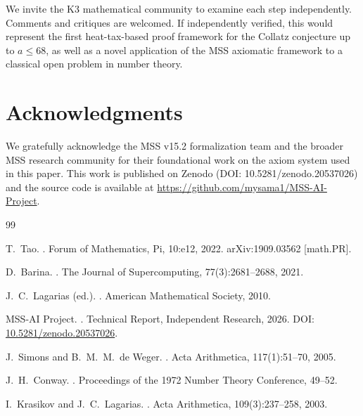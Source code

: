 \documentclass[11pt,a4paper]{article}
\begin{document}
We invite the K3 mathematical community to examine each step independently. Comments and critiques are welcomed. If independently verified, this would represent the first heat-tax-based proof framework for the Collatz conjecture up to $a\le 68$, as well as a novel application of the MSS axiomatic framework to a classical open problem in number theory.

\section*{Acknowledgments}
We gratefully acknowledge the MSS v15.2 formalization team and the broader MSS research community for their foundational work on the axiom system used in this paper. This work is published on Zenodo (DOI: 10.5281/zenodo.20537026) and the source code is available at \url{https://github.com/mysama1/MSS-AI-Project}.

\begin{thebibliography}{99}

T.~Tao.
.
\newblock Forum of Mathematics, Pi, 10:e12, 2022.
\newblock arXiv:1909.03562 [math.PR].

D.~Barina.
.
\newblock The Journal of Supercomputing, 77(3):2681--2688, 2021.

J.~C.~Lagarias (ed.).
.
\newblock American Mathematical Society, 2010.

MSS-AI Project.
.
\newblock Technical Report, Independent Research, 2026.
\newblock DOI: \href{https://doi.org/10.5281/zenodo.20537026}{10.5281/zenodo.20537026}.

J.~Simons and B.~M.~M.~de Weger.
.
\newblock Acta Arithmetica, 117(1):51--70, 2005.

J.~H.~Conway.
.
\newblock Proceedings of the 1972 Number Theory Conference, 49--52.

I.~Krasikov and J.~C.~Lagarias.
.
\newblock Acta Arithmetica, 109(3):237--258, 2003.

\end{thebibliography}
\end{document}
